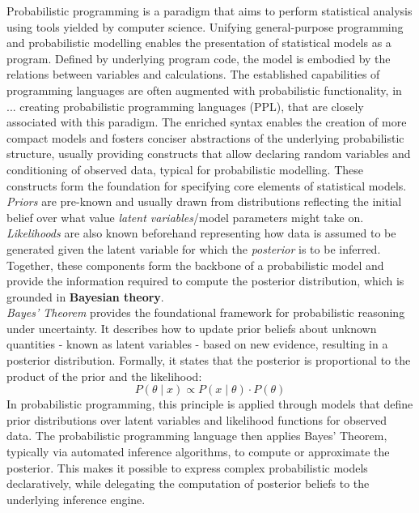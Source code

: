 \documentclass[11pt]{report}
\begin{document}
Probabilistic programming is a paradigm that aims to perform statistical analysis using tools yielded by computer science.\cite{introductionprobabilisticprogramming}
Unifying general-purpose programming and probabilistic modelling enables the presentation of statistical models as a program. Defined by underlying program code, the model is
embodied by the relations between variables and calculations. The established capabilities of programming languages are often augmented with 
probabilistic functionality, in ... creating probabilistic programming languages (PPL),\cite{probProgrammingPrinciples} that are closely associated with this paradigm. 
The enriched syntax enables the creation of more compact models and fosters conciser abstractions of the underlying probabilistic structure, usually providing constructs
that allow declaring random variables and conditioning of observed data, typical for probabilistic modelling. These constructs form the foundation for specifying core elements
of statistical models. \textit{Priors} are pre-known and usually drawn from distributions reflecting the initial belief over what value
\textit{latent variables}/model parameters might take on. \textit{Likelihoods} are also known beforehand representing how data is assumed to be generated given the 
latent variable for which the \textit{posterior} is to be inferred. Together, these components form the backbone of a probabilistic model and provide the information required
to compute the posterior distribution, which is grounded in \textbf{Bayesian theory}.\cite{introductionprobabilisticprogramming}
\\

\textit{Bayes’ Theorem} provides the foundational framework for probabilistic reasoning under uncertainty. It describes how to update prior beliefs about unknown 
quantities - known as latent variables - based on new evidence, resulting in a posterior distribution. Formally, it states that the posterior is proportional to the
product of the prior and the likelihood:
\[
P(\theta \mid x) \propto P(x \mid \theta) \cdot P(\theta)
\]
In probabilistic programming, this principle is applied through models that define prior distributions over latent variables and likelihood functions for 
observed data. The probabilistic programming language then applies Bayes' Theorem, typically via automated inference algorithms, to compute or approximate the posterior.
This makes it possible to express complex probabilistic models declaratively, while delegating the computation of posterior beliefs to the underlying inference engine.
\\
\end{document}
